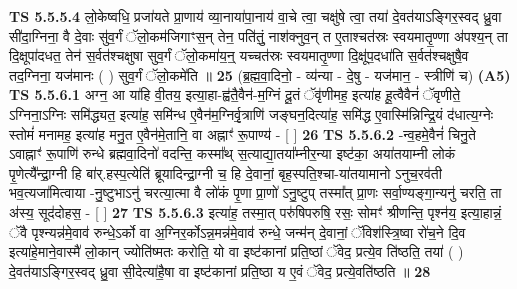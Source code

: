 \documentclass[17pt]{extarticle}
\begin{document}
                  \newline
                                \textbf{ TS 5.5.5.4} \newline
                  लो॒केष्वधि॒ प्रजा॑यते प्रा॒णाय॑ व्या॒नाया॑पा॒नाय॑ वा॒चे त्वा॒ चक्षु॑षे त्वा॒ तया॑ दे॒वत॑याऽङ्गिर॒स्वद् ध्रु॒वा सी॑दा॒ग्निना॒ वै दे॒वाः सु॑व॒र्गं ॅलो॒कम॑जिगाꣳस॒न् तेन॒ पति॑तुं॒ नाश॑क्नुव॒न् त ए॒ताश्चत॑स्रः स्वयमातृ॒ण्णा अ॑पश्य॒न् ता दि॒क्षूपा॑दधत॒ तेन॑ स॒र्वत॑श्चक्षुषा सुव॒र्गं ॅलो॒कमा॑य॒न्॒ यच्चत॑स्रः स्वयमातृ॒ण्णा दि॒क्षू॑प॒दधा॑ति स॒र्वत॑श्चक्षुषै॒व तद॒ग्निना॒ यज॑मानः ( ) सुव॒र्गं ॅलो॒कमे॑ति ॥ \textbf{  25} \newline
                  \newline
                      (ब्र॒ह्म॒वा॒दिनो॒ - व्य॑न्या - दे॒षु - यज॑मान॒ - स्त्रीणि॑ च)  \textbf{(A5)} \newline \newline
                                        \textbf{ TS 5.5.6.1} \newline
                  अग्न॒ आ या॑हि वी॒तय॒ इत्या॒हा-ह्व॑तै॒वैन॑-म॒ग्निं दू॒तं ॅवृ॑णीमह॒ इत्या॑ह हू॒त्वैवैनं॑ ॅवृणीते॒ ऽग्निना॒ऽग्निः समि॑द्ध्यत॒ इत्या॑ह॒ समि॑न्ध ए॒वैन॑म॒ग्निर्वृ॒त्राणि॑ जङ्घन॒दित्या॑ह॒ समि॑द्ध ए॒वास्मि॑न्निन्द्रि॒यं द॑धात्य॒ग्नेः स्तोमं॑ मनामह॒ इत्या॑ह मनु॒त ए॒वैन॑मे॒तानि॒ वा अह्नाꣳ॑ रू॒पाण्य॑ - [  ] \textbf{  26} \newline
                  \newline
                                \textbf{ TS 5.5.6.2} \newline
                  -न्व॒हमे॒वैनं॑ चिनु॒ते ऽवाह्नाꣳ॑ रू॒पाणि॑ रुन्धे ब्रह्मवा॒दिनो॑ वदन्ति॒ कस्मा᳚थ् स॒त्याद्या॒तया᳚म्नीर॒न्या इष्ट॑का॒ अया॑तयाम्नी लोकं पृ॒णेत्यै᳚न्द्रा॒ग्नी हि बा॑र्.हस्प॒त्येति॑ ब्रूयादिन्द्रा॒ग्नी च॒ हि दे॒वानां॒ बृह॒स्पति॒श्चा-या॑तयामानो ऽनुच॒रव॑ती भव॒त्यजा॑मित्वाया -नु॒ष्टुभाऽनु॑ चरत्या॒त्मा वै लो॑कं पृ॒णा प्रा॒णो॑ ऽनु॒ष्टुप् तस्मा᳚त् प्रा॒णः सर्वा॒ण्यङ्गा॒न्यनु॑ चरति॒ ता अ॑स्य॒ सूद॑दोहस॒ - [  ] \textbf{  27} \newline
                  \newline
                                \textbf{ TS 5.5.6.3} \newline
                  इत्या॑ह॒ तस्मा॒त् परु॑षिपरुषि॒ रसः॒ सोमꣳ॑ श्रीणन्ति॒ पृश्न॑य॒ इत्या॒हान्नं॒ ॅवै पृश्न्यन्न॑मे॒वाव॑ रुन्धे॒ऽर्को वा अ॒ग्निर॒र्कोऽन्न॒मन्न॑मे॒वाव॑ रुन्धे॒ जन्म॑न् दे॒वानां॒ ॅविश॑स्त्रि॒ष्वा रो॑च॒ने दि॒व इत्या॑हे॒माने॒वास्मै॑ लो॒कान् ज्योति॑ष्मतः करोति॒ यो वा इष्ट॑कानां प्रति॒ष्ठां ॅवेद॒ प्रत्ये॒व ति॑ष्ठति॒ तया॑ ( ) दे॒वत॑याऽङ्गिर॒स्वद् ध्रु॒वा सी॒देत्या॑है॒षा वा इष्ट॑कानां प्रति॒ष्ठा य ए॒वं ॅवेद॒ प्रत्ये॒वति॑ष्ठति ॥ \textbf{  28 } \newline
\end{document}
